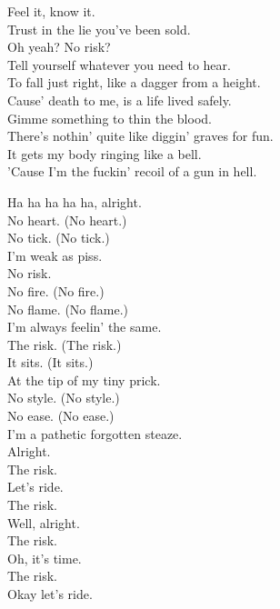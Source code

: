 


Feel it, know it. \\
Trust in the lie you've been sold. \\
Oh yeah? No risk? \\
Tell yourself whatever you need to hear. \\
To fall just right, like a dagger from a height. \\
Cause' death to me, is a life lived safely. \\

Gimme something to thin the blood. \\
There's nothin' quite like diggin' graves for fun. \\
It gets my body ringing like a bell. \\
'Cause I'm the fuckin' recoil of a gun in hell. \\


Ha ha ha ha ha, alright. \\
No heart. (No heart.) \\
No tick. (No tick.) \\
I'm weak as piss. \\
No risk. \\
No fire. (No fire.) \\
No flame. (No flame.) \\
I'm always feelin' the same. \\
The risk. (The risk.) \\
It sits. (It sits.) \\
At the tip of my tiny prick. \\
No style. (No style.) \\
No ease. (No ease.) \\
I'm a pathetic forgotten steaze. \\

Alright. \\
The risk. \\
Let's ride. \\
The risk. \\
Well, alright. \\
The risk. \\
Oh, it's time. \\
The risk. \\
Okay let's ride. \\

